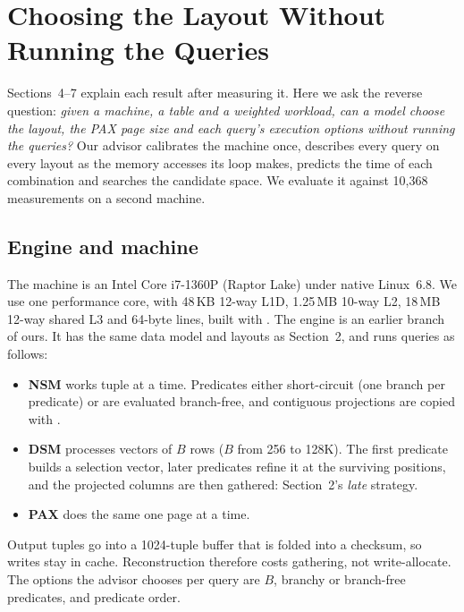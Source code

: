 \section{Choosing the Layout Without Running the Queries}
\label{sec:advisor}

Sections~4--7 explain each result after measuring it. Here we ask the reverse question:
\emph{given a machine, a table and a weighted workload, can a model choose the layout, the PAX
page size and each query's execution options without running the queries?} Our advisor
calibrates the machine once, describes every query on every layout as the memory accesses its
loop makes, predicts the time of each combination and searches the candidate space. We
evaluate it against 10,368 measurements on a second machine.

\subsection{Engine and machine}
The machine is an Intel Core i7-1360P (Raptor Lake) under native Linux~6.8. We use one
performance core, with 48\,KB 12-way L1D, 1.25\,MB 10-way L2, 18\,MB 12-way shared L3 and
64-byte lines, built with . The engine is an earlier branch of ours.
It has the same data model and layouts as Section~2, and runs queries as follows:
\begin{itemize}
  \item \textbf{NSM} works tuple at a time. Predicates either short-circuit (one branch per
  predicate) or are evaluated branch-free, and contiguous projections are copied with
  .
  \item \textbf{DSM} processes vectors of $B$ rows ($B$ from 256 to 128K). The first predicate
  builds a selection vector, later predicates refine it at the surviving positions, and the
  projected columns are then gathered: Section~2's \emph{late} strategy.
  \item \textbf{PAX} does the same one page at a time.
\end{itemize}
Output tuples go into a 1024-tuple buffer that is folded into a checksum, so writes stay in
cache. Reconstruction therefore costs gathering, not write-allocate. The options the advisor
chooses per query are $B$, branchy or branch-free predicates, and predicate order.

